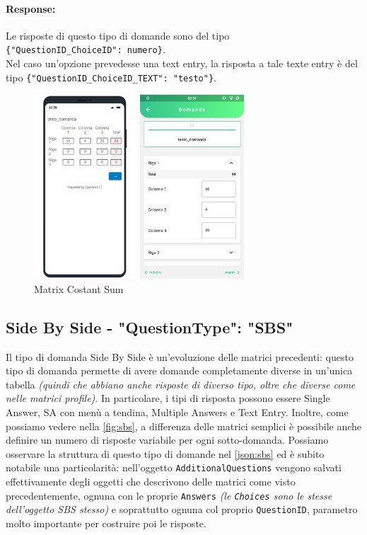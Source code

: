 \paragraph{Response:}
Le risposte di questo tipo di domande sono del tipo\\ \texttt{\{"QuestionID\_ChoiceID": numero\}}.\\Nel caso un'opzione prevedesse una text entry, la risposta a tale texte entry è del tipo \texttt{\{"QuestionID\_ChoiceID\_TEXT": "testo"\}}.

\begin{figure}[h!]
\centering
\includegraphics[width=0.7\textwidth]{img/matrix_cs}
\caption{Matrix Costant Sum}
\label{fig:matrix_cs}
\end{figure}

\clearpage
\subsection{Side By Side - "QuestionType": "SBS"}
Il tipo di domanda Side By Side è un'evoluzione delle matrici precedenti: questo tipo di domanda permette di avere domande completamente diverse in un'unica tabella \textit{(quindi che abbiano anche risposte di diverso tipo, oltre che diverse come nelle matrici profile)}. In particolare, i tipi di risposta possono essere Single Answer, SA con menù a tendina, Multiple Answers e Text Entry. Inoltre, come possiamo vedere nella \autoref{fig:sbs}, a differenza delle matrici semplici è possibile anche definire un numero di risposte variabile per ogni sotto-domanda. Possiamo osservare la struttura di questo tipo di domande nel \autoref{json:sbs} ed è subito notabile una particolarità: nell'oggetto \texttt{AdditionalQuestions} vengono salvati effettivamente degli oggetti che descrivono delle matrici come visto precedentemente, ognuna con le proprie \texttt{Answers} \textit{(le \texttt{Choices} sono le stesse dell'oggetto SBS stesso)} e soprattutto ognuna col proprio \texttt{QuestionID}, parametro molto importante per costruire poi le risposte.

